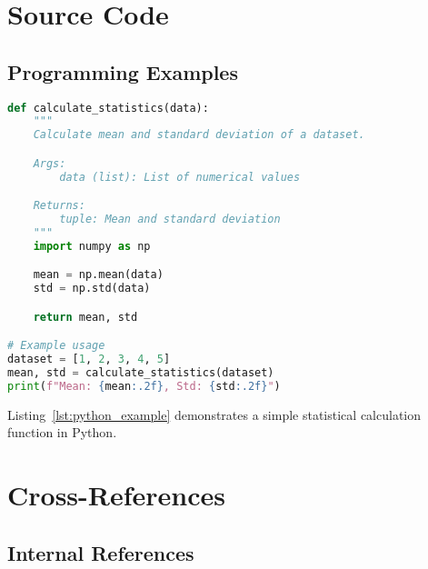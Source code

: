 \section{Source Code}
\label{sec:source_code}

\subsection{Programming Examples}
\label{subsec:code_examples}

\begin{lstlisting}[language=Python, caption={Python function example}, label=lst:python_example]
def calculate_statistics(data):
    """
    Calculate mean and standard deviation of a dataset.

    Args:
        data (list): List of numerical values

    Returns:
        tuple: Mean and standard deviation
    """
    import numpy as np

    mean = np.mean(data)
    std = np.std(data)

    return mean, std

# Example usage
dataset = [1, 2, 3, 4, 5]
mean, std = calculate_statistics(dataset)
print(f"Mean: {mean:.2f}, Std: {std:.2f}")
\end{lstlisting}

Listing~\ref{lst:python_example} demonstrates a simple statistical calculation
function in Python.

\section{Cross-References}
\label{sec:cross_references}

\subsection{Internal References}
\label{subsec:internal_refs}

